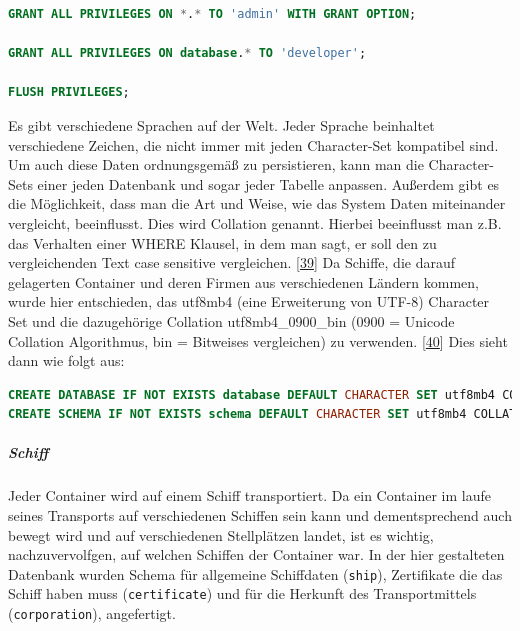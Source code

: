 \documentclass[
    headings=optiontotocandhead,%
    twoside,
    numbers=noenddot,%
    12pt, %
    titlepage, %
    parskip=full, %
    listof=leveldown, 
    numbers=noenddot, %
    a4paper,DIV=14,
    BCOR=15mm,
]{scrbook}
\newcommand{\passthrough}[1]{#1}
\begin{document}
\begin{lstlisting}[language=SQL, caption={Zuweisen von Rollen zu Benutzergruppen in MySQL}]
GRANT ALL PRIVILEGES ON *.* TO 'admin' WITH GRANT OPTION;

GRANT ALL PRIVILEGES ON database.* TO 'developer';

FLUSH PRIVILEGES;
\end{lstlisting}

Es gibt verschiedene Sprachen auf der Welt. Jeder Sprache beinhaltet
verschiedene Zeichen, die nicht immer mit jeden Character-Set kompatibel
sind. Um auch diese Daten ordnungsgemäß zu persistieren, kann man die
Character-Sets einer jeden Datenbank und sogar jeder Tabelle anpassen.
Außerdem gibt es die Möglichkeit, dass man die Art und Weise, wie das
System Daten miteinander vergleicht, beeinflusst. Dies wird Collation
genannt. Hierbei beeinflusst man z.B. das Verhalten einer WHERE Klausel,
in dem man sagt, er soll den zu vergleichenden Text case sensitive
vergleichen. {[}\protect\hyperlink{ref-DB-character-set}{39}{]} Da
Schiffe, die darauf gelagerten Container und deren Firmen aus
verschiedenen Ländern kommen, wurde hier entschieden, das utf8mb4 (eine
Erweiterung von UTF-8) Character Set und die dazugehörige Collation
utf8mb4\_0900\_bin (0900 = Unicode Collation Algorithmus, bin =
Bitweises vergleichen) zu verwenden.
{[}\protect\hyperlink{ref-mysql-character-set}{40}{]} Dies sieht dann
wie folgt aus:

\begin{lstlisting}[language=SQL, caption={Erstellen einer MySQL Datenbank mit abgeänderten Character Set und Collation}]
CREATE DATABASE IF NOT EXISTS database DEFAULT CHARACTER SET utf8mb4 COLLATE utf8mb4_0900_bin;
CREATE SCHEMA IF NOT EXISTS schema DEFAULT CHARACTER SET utf8mb4 COLLATE utf8mb4_0900_bin;
\end{lstlisting}

\hypertarget{schiff}{%
\subparagraph{Schiff}\label{schiff}}

Jeder Container wird auf einem Schiff transportiert. Da ein Container im
laufe seines Transports auf verschiedenen Schiffen sein kann und
dementsprechend auch bewegt wird und auf verschiedenen Stellplätzen
landet, ist es wichtig, nachzuvervolfgen, auf welchen Schiffen der
Container war. In der hier gestalteten Datenbank wurden Schema für
allgemeine Schiffdaten (\passthrough{\lstinline!ship!}), Zertifikate die
das Schiff haben muss (\passthrough{\lstinline!certificate!}) und für
die Herkunft des Transportmittels
(\passthrough{\lstinline!corporation!}), angefertigt.
\end{document}
